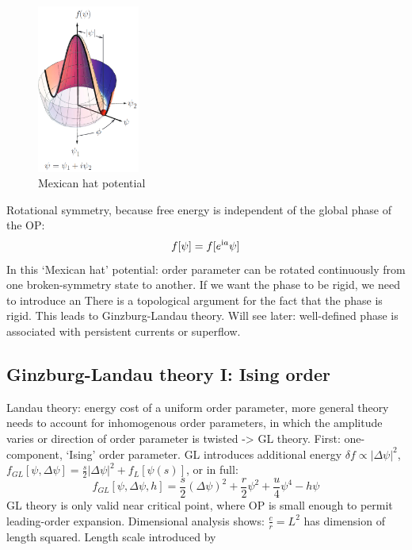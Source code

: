 \documentclass[../main.tex]{subfiles}
\begin{document}
\begin{figure}[t]
	\centering
	\includegraphics[width=0.3\textwidth]{images/landau free energy mexican hat}
	\caption{Mexican hat potential}
	\label{fig:Landau free energy mexican hat potential}
\end{figure}

Rotational symmetry, because free energy is independent of the global phase of the OP:
\begin{equation}
	f [\psi] = f [e^{\mathrm{i} a } \psi]
\end{equation}
In this `Mexican hat' potential: order parameter can be rotated continuously from one broken-symmetry state to another.
If we want the phase to be rigid, we need to introduce an
There is a topological argument for the fact that the phase is rigid.
This leads to Ginzburg-Landau theory.
Will see later: well-defined phase is associated with persistent currents or superflow.

\subsection{Ginzburg-Landau theory I: Ising order}

Landau theory: energy cost of a uniform order parameter, more general theory needs to account for inhomogenous order parameters, in which the amplitude varies or direction of order parameter is twisted -> GL theory.
First: one-component, `Ising' order parameter.
GL introduces additional energy \(\delta f \propto \vert \Delta \psi \vert^2\), \(f_{GL} [\psi, \Delta \psi] = \frac{s}{2} \vert \Delta \psi \vert^2 + f_L [\psi(s)]\), or in full:
\begin{equation}
	f_{GL} [\psi, \Delta \psi, h] = \frac{s}{2} (\Delta \psi)^2 + \frac{r}{2} \psi^2 + \frac{u}{4} \psi^4 - h \psi
\end{equation}
GL theory is only valid near critical point, where OP is small enough to permit leading-order expansion.
Dimensional analysis shows: \(\frac{c}{r} = L^2\)  has dimension of length squared.
Length scale introduced by
\end{document}
